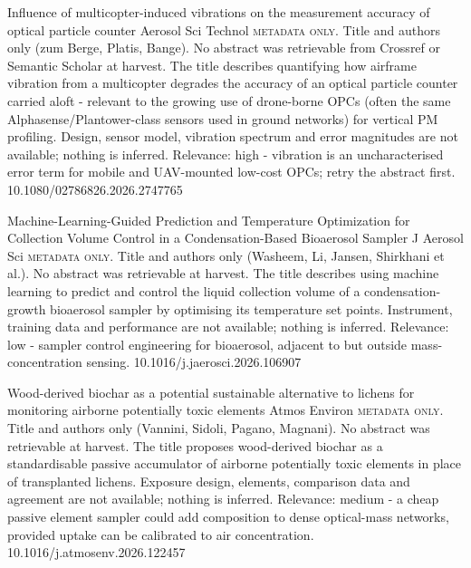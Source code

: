 \documentclass[10pt]{article}
\begin{document}
{Influence of multicopter-induced vibrations on the measurement accuracy of optical particle counter}
{Aerosol Sci Technol}
{\textsc{metadata only.} Title and authors only (zum Berge, Platis, Bange). No abstract was retrievable from Crossref or Semantic Scholar at harvest. The title describes quantifying how airframe vibration from a multicopter degrades the accuracy of an optical particle counter carried aloft - relevant to the growing use of drone-borne OPCs (often the same Alphasense/Plantower-class sensors used in ground networks) for vertical PM profiling. Design, sensor model, vibration spectrum and error magnitudes are not available; nothing is inferred. Relevance: high - vibration is an uncharacterised error term for mobile and UAV-mounted low-cost OPCs; retry the abstract first.}
{10.1080/02786826.2026.2747765}

{Machine-Learning-Guided Prediction and Temperature Optimization for Collection Volume Control in a Condensation-Based Bioaerosol Sampler}
{J Aerosol Sci}
{\textsc{metadata only.} Title and authors only (Washeem, Li, Jansen, Shirkhani et al.). No abstract was retrievable at harvest. The title describes using machine learning to predict and control the liquid collection volume of a condensation-growth bioaerosol sampler by optimising its temperature set points. Instrument, training data and performance are not available; nothing is inferred. Relevance: low - sampler control engineering for bioaerosol, adjacent to but outside mass-concentration sensing.}
{10.1016/j.jaerosci.2026.106907}

{Wood-derived biochar as a potential sustainable alternative to lichens for monitoring airborne potentially toxic elements}
{Atmos Environ}
{\textsc{metadata only.} Title and authors only (Vannini, Sidoli, Pagano, Magnani). No abstract was retrievable at harvest. The title proposes wood-derived biochar as a standardisable passive accumulator of airborne potentially toxic elements in place of transplanted lichens. Exposure design, elements, comparison data and agreement are not available; nothing is inferred. Relevance: medium - a cheap passive element sampler could add composition to dense optical-mass networks, provided uptake can be calibrated to air concentration.}
{10.1016/j.atmosenv.2026.122457}
\end{document}
